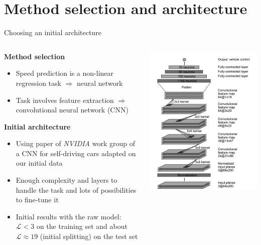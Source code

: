 \section{Method selection and architecture}

\begin{frame}{Choosing an initial architecture}
	\begin{columns}[c]
		\begin{column}{0.55\textwidth}
			\textbf{Method selection}
			\begin{itemize}
				\item<+-> Speed prediction is a non-linear regression task $\Rightarrow$ neural network
				\item<+-> Task involves feature extraction $\Rightarrow$ convolutional neural network (CNN)
			\end{itemize}
			\textbf{Initial architecture}
			\begin{itemize}
				\item<+-> Using paper of \textit{NVIDIA} work group \cite{NVIDIA2016} of a CNN for self-driving cars adapted on our initial data
				\item<+-> Enough complexity and layers to handle the task and lots of possibilities to fine-tune it
				\item<+-> Initial results with the raw model: $\mathcal{L} < 3$ on the training set and about $\mathcal{L} \approx 19$ (initial splitting) 
				on the test set
			\end{itemize}
		\end{column}
		\begin{column}{0.4\textwidth}
			\includegraphics[width=\textwidth]{./imgs/NetworkOriginal.png}

\end{column}
\end{columns}
\end{frame}

